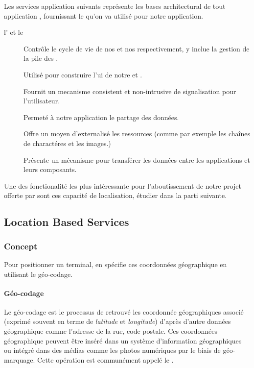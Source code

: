 Les services application suivants représente les bases architectural de tout application \android{}, fournissant le  qu'on va utilisé pour notre application.

\begin{description}

\item [l' et le ]
Contrôle le cycle de vie de nos  et nos  respectivement, y inclue la gestion de la pile des .

\item[]
Utilisé pour construire l'\gls{ui} de notre  et .

\item[]
Fournit un mecanisme consistent et non-intrusive de signalisation pour l'utilisateur.

\item[]
Permeté à notre application le partage des données.

\item[]
Offre un moyen d'externalisé les ressources (comme par exemple les chaînes de charactéres et les images.)

\item[]
Présente un mécanisme pour transférer les données entre les applications et leurs composants.

\end{description}

Une des fonctionalité les plus intéressante pour l'aboutissement de notre projet offerte par \android{} sont ces capacité de localisation, étudier dans la parti suivante.

\subsection{Location Based Services}

\subsubsection{Concept}

Pour positionner un terminal, en spécifie ces coordonnées géographique en utilisant le géo-codage.

\paragraph[Géo-codage]{Géo-codage\cite{wiki:geocoding}}
Le géo-codage est le processus de retrouvé les coordonnée géographiques associé (exprimé souvent en terme de \textit{latitude} et \textit{longitude}) d'après d'autre données géographique comme l'adresse de la rue, code postale. Ces coordonnées géographique peuvent être inséré dans un système d'information géographiques ou intégré dans des médias comme les photos numériques par le biais de géo-marquage. Cette opération est communément appelé le .

